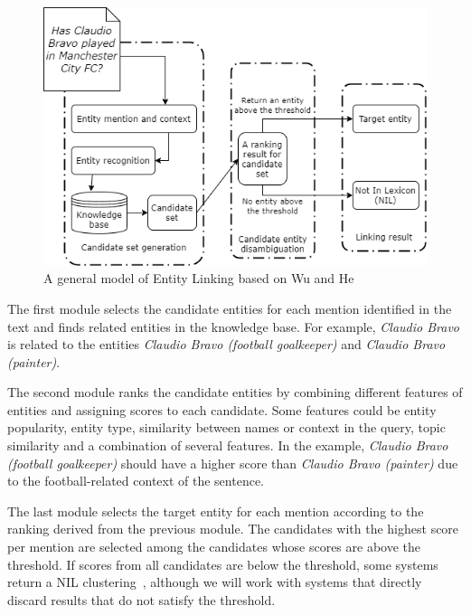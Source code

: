 \begin{figure}[!h]
    \centering
    \includegraphics[scale=.5]{imagenes/2_theorical_framework/information_extraction/entityLinkingModel.PNG}
    \caption{A general model of Entity Linking based on Wu and He~\cite{EL:survey-WuHH18}}
    \label{fig:entitylinkingGeneralModel}
\end{figure}

The first module selects the candidate entities for each mention identified in the text and 
finds related entities in the knowledge base. For example, \textit{Claudio Bravo} is related 
to the entities \textit{Claudio Bravo (football goalkeeper)} and \textit{Claudio Bravo (painter)}.

The second module ranks the candidate entities by combining different features of 
entities and assigning scores to each candidate. Some features could be entity popularity, 
entity type, similarity between names or context in the query, topic similarity and a 
combination of several features. In the example, \textit{Claudio Bravo (football goalkeeper)} 
should have a higher score than \textit{Claudio Bravo (painter)} due to the football-related 
context of the sentence. 

The last module selects the target entity for each mention according to the ranking derived 
from the previous module. The candidates with the highest score per mention are selected 
among the candidates whose scores are above the threshold. If scores from all candidates are 
below the threshold, some systems return a NIL clustering~\cite{infExtr:ji2010overview}, 
although we will work with systems that directly discard results that do not satisfy the 
threshold.

